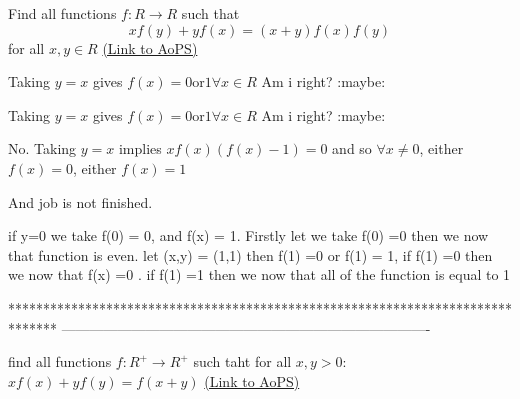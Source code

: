 \begin{problem}
	Find all functions $f: R\to R$ such that \[xf(y)+yf(x)=(x+y)f(x)f(y)\] for all $x,y\in R$
	\flushright \href{https://artofproblemsolving.com/community/c6h572541}{(Link to AoPS)}
\end{problem}



\begin{solution}
	Taking $y=x$
gives
$f(x)=0\text {or} 1\forall x\in R$
Am i right? :maybe:
\end{solution}



\begin{solution}
	\begin{tcolorbox}Taking $y=x$
gives
$f(x)=0\text {or} 1\forall x\in R$
Am i right? :maybe:\end{tcolorbox}
No. Taking $y=x$ implies $xf(x)(f(x)-1)=0$ and so $\forall x\ne 0$, either $f(x)=0$, either $f(x)=1$

And job is not finished.
\end{solution}



\begin{solution}
	if y=0 we take f(0) = 0, and f(x) = 1. 
Firstly let we take f(0) =0 then we now that function is even.
let (x,y) = (1,1) then f(1) =0 or f(1) = 1, 
if f(1) =0 then we now that f(x) =0 .
if f(1) =1 then we now that all of the function is equal to 1
\end{solution}
*******************************************************************************
-------------------------------------------------------------------------------

\begin{problem}
	find all functions $f:R^+ \rightarrow R^+$ such taht for all $x,y>0$:
$xf(x)+yf(y)=f(x+y)$
	\flushright \href{https://artofproblemsolving.com/community/c6h572549}{(Link to AoPS)}
\end{problem}



